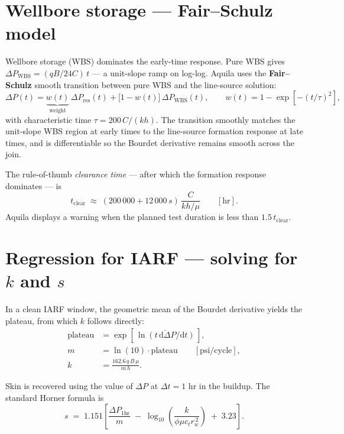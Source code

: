 \documentclass[11pt,a4paper]{article}
\newcommand{\D}{\mathrm{d}}
\newcommand{\kh}{kh}
\begin{document}
\section{Wellbore storage — Fair--Schulz model}
\label{sec:wbs}

Wellbore storage (WBS) dominates the early-time response. Pure WBS
gives $\Delta P_\text{WBS} = (qB/24C)\,t$ — a unit-slope ramp on
log-log. Aquila uses the \textbf{Fair--Schulz} smooth transition between
pure WBS and the line-source solution:
\begin{equation}
    \Delta P(t) = \underbrace{w(t)}_{\text{weight}}\,\Delta P_\text{res}(t)
                + \bigl[1-w(t)\bigr]\,\Delta P_\text{WBS}(t),
    \qquad
    w(t) = 1 - \exp\!\left[-(t/\tau)^2\right],
\end{equation}
with characteristic time $\tau = 200\,C/(kh)$. The transition smoothly
matches the unit-slope WBS region at early times to the line-source
formation response at late times, and is differentiable so the
Bourdet derivative remains smooth across the join.

The rule-of-thumb \emph{clearance time} — after which the formation
response dominates — is
\begin{equation}
    t_\text{clear} \;\approx\; (200\,000 + 12\,000\,s)\,\frac{C}{\kh/\mu}
    \qquad [\mathrm{hr}].
\end{equation}
Aquila displays a warning when the planned test duration is less than
$1.5\,t_\text{clear}$.

\section{Regression for IARF — solving for $k$ and $s$}
\label{sec:regress-radial}

In a clean IARF window, the geometric mean of the Bourdet derivative
yields the plateau, from which $k$ follows directly:
\begin{align}
    \text{plateau} &= \exp\!\left[\,\overline{\ln(t\,\D\Delta P/\D t)}\,\right], \\
    m              &= \ln(10)\cdot\text{plateau} \qquad [\mathrm{psi/cycle}], \\
    k              &= \frac{162.6\,q\,B\,\mu}{m\,h}.
\end{align}

Skin is recovered using the value of $\Delta P$ at $\Delta t = 1$ hr in
the buildup. The standard Horner formula is
\begin{equation}
    s \;=\; 1.151\!\left[
        \frac{\Delta P_{1\mathrm{hr}}}{m}
        \;-\;
        \log_{10}\!\left(\frac{k}{\phi\mu c_t r_w^{\,2}}\right)
        \;+\;
        3.23
    \right].
    \label{eq:skin-horner}
\end{equation}
\end{document}
